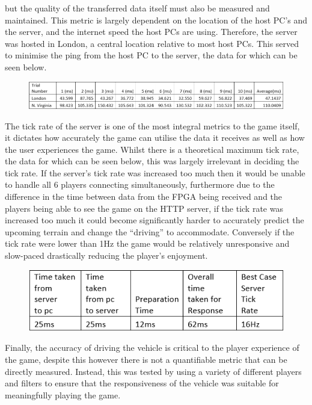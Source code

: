 \documentclass[12pt,a4paper]{article}
\begin{document}
 but the quality of the transferred data itself must also be measured and maintained. 
 This metric is largely dependent on the location of the host PC’s and the server, 
 and the internet speed the host PCs are using. Therefore, the server was hosted in 
 London, a central location relative to most host PCs. This served to minimise the 
 ping from the host PC to the server, the data for which can be seen below.
 \begin{figure} [h!]
    \centering
    \includegraphics[scale = 0.5]{Ping.png}
\end{figure}
 The tick rate of the server is one of the most integral metrics to the game itself, 
 it dictates how accurately the game can utilise the data it receives as well as how 
 the user experiences the game. Whilst there is a theoretical maximum tick rate, the 
 data for which can be seen below, this was largely irrelevant in deciding the tick 
 rate. If the server’s tick rate was increased too much then it would be unable to 
 handle all 6 players connecting simultaneously, furthermore due to the difference 
 in the time between data from the FPGA being received and the players being able to 
 see the game on the HTTP server, if the tick rate was increased too much it could 
 become significantly harder to accurately predict the upcoming terrain and change 
 the “driving” to accommodate. Conversely if the tick rate were lower than 1Hz the 
 game would be relatively unresponsive and slow-paced drastically reducing the 
 player’s enjoyment.
 \par
 \begin{figure} [h!]
    \centering
    \includegraphics[scale = 1]{Tick.png}
\end{figure}
 \par
 Finally, the accuracy of driving the vehicle is critical to the player experience 
 of the game, despite this however there is not a quantifiable metric that can be 
 directly measured. Instead, this was tested by using a variety of different players 
 and filters to ensure that the responsiveness of the vehicle was suitable for 
 meaningfully playing the game.
\end{document}
